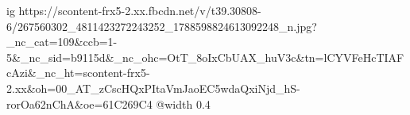  
 
 
 
 

\ifcmt
  ig https://scontent-frx5-2.xx.fbcdn.net/v/t39.30808-6/267560302_4811423272243252_1788598824613092248_n.jpg?_nc_cat=109&ccb=1-5&_nc_sid=b9115d&_nc_ohc=OtT_8oIxCbUAX_huV3c&tn=lCYVFeHcTIAFcAzi&_nc_ht=scontent-frx5-2.xx&oh=00_AT_zCscHQxPItaVmJaoEC5wdaQxiNjd_hS-rorOa62nChA&oe=61C269C4
  @width 0.4
\fi
